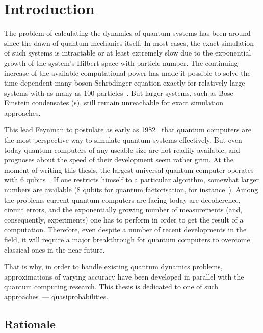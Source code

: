 \chapter{Introduction}

The problem of calculating the dynamics of quantum systems has been around since the dawn of quantum mechanics itself.
In most cases, the exact simulation of such systems is intractable or at least extremely slow due to the exponential growth of the system's Hilbert space with particle number.
The continuing increase of the available computational power has made it possible to solve the time-dependent many-boson Schr\"odinger equation exactly for relatively large systems with as many as 100 particles~\cite{Sakmann2009}.
But larger systems, such as Bose-Einstein condensates (s), still remain unreachable for exact simulation approaches.

This lead Feynman to postulate as early as 1982~\cite{Feynman1982} that quantum computers are the most perspective way to simulate quantum systems effectively.
But even today quantum computers of any useable size are not readily available, and prognoses about the speed of their development seem rather grim.
At the moment of writing this thesis, the largest universal quantum computer operates with 6 qubits~\cite{Lanyon2011}.
If one restricts himself to a particular algorithm, somewhat larger numbers are available (8 qubits for quantum factorisation, for instance~\cite{Xu2012}).
Among the problems current quantum computers are facing today are decoherence, circuit errors, and the exponentially growing number of measurements (and, consequently, experiments) one has to perform in order to get the result of a computation.
Therefore, even despite a number of recent developments in the field, it will require a major breakthrough for quantum computers to overcome classical ones in the near future.

That is why, in order to handle existing quantum dynamics problems, approximations of varying accuracy have been developed in parallel with the quantum computing research.
This thesis is dedicated to one of such approaches~--- quasiprobabilities.


\section{Rationale}

